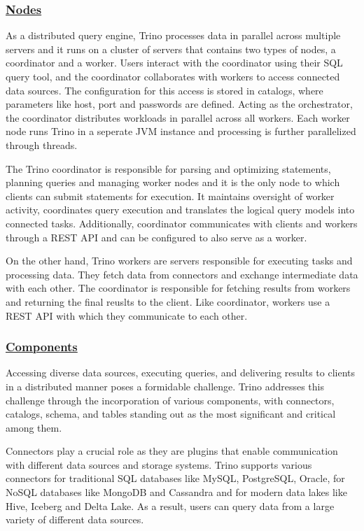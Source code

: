 \documentclass[conference]{IEEEtran}
\begin{document}
\subsubsection{\textbf{\underline{Nodes}}}
As a distributed query engine, Trino processes data in parallel across multiple servers and it runs on a cluster of servers that contains two types of nodes,
a coordinator and a worker. Users interact with the coordinator using their SQL query tool, and the coordinator collaborates with workers to access connected
data sources. The configuration for this access is stored in catalogs, where parameters like host, port and passwords are defined. Acting as the orchestrator,
the coordinator distributes workloads in parallel across all workers. Each worker node runs Trino in a seperate JVM instance and processing is further parallelized through threads.

The Trino coordinator is responsible for parsing and optimizing statements, planning queries and managing worker nodes and it is the only node to which clients can submit
statements for execution. It maintains oversight of worker activity, coordinates query execution and translates the logical query models into connected tasks. Additionally,
coordinator communicates with clients and workers through a REST API and can be configured to also serve as a worker.

On the other hand, Trino workers are servers responsible for executing tasks and processing data. They fetch data from connectors and exchange intermediate data with
each other. The coordinator is responsible for fetching results from workers and returning the final reuslts to the client. Like coordinator, workers use a REST API
with which they communicate to each other.

\subsubsection{\textbf{\underline{Components}}}
Accessing diverse data sources, executing queries, and delivering results to clients in a distributed manner poses a formidable challenge. Trino addresses this challenge through
the incorporation of various components, with connectors, catalogs, schema, and tables standing out as the most significant and critical among them.

Connectors play a crucial role as they are plugins that enable communication with different data sources and storage systems.
Trino supports various connectors for traditional SQL databases like MySQL, PostgreSQL, Oracle, for NoSQL databases like MongoDB and Cassandra and for modern data lakes like
Hive, Iceberg and Delta Lake. As a result, users can query data from a large variety of different data sources.
\end{document}
